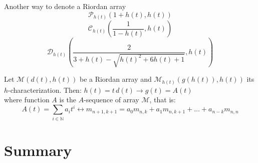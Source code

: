 \documentclass[10pt,serif, professionalfont]{beamer}
\begin{document}
\begin{frame}{Another way to denote a Riordan array}
    \begin{displaymath} 
        \mathcal{P}_{h(t)}\left( 1+h(t), h(t) \right)
    \end{displaymath} 
    \begin{displaymath} 
        \mathcal{C}_{h(t)}\left(\frac{1}{1-h\left(t\right)}, h(t) \right)
    \end{displaymath} 
    \begin{displaymath} 
         \mathcal{D}_{h(t)}\left( \frac{2}{3+h(t)-\sqrt{h(t)^2+6h(t)+1}}, h(t) \right)
    \end{displaymath} 
    \pause
    \begin{theorem}
        Let $\mathcal{M}(d(t), h(t))$ be a Riordan array and $\mathcal{M}_{h(t)}\left( g(h(t)), h(t) \right) $
        its $h$-characterization. Then: $h(t)=t\,d(t) \rightarrow g(t)=A(t)$\\
        where function $A$ is the $A$-sequence of array $\mathcal{M}$, that is:
        \begin{displaymath}
            A(t)=\sum_{i\in\mathbb{N}}{a_{i}t^i} \leftrightarrow m_{n+1,k+1}=a_{0}m_{n,k}+a_{1}m_{n,k+1}+\ldots+a_{n-k}m_{n,n}
        \end{displaymath}
    \end{theorem}
\end{frame}

\section*{Summary}
\end{document}
